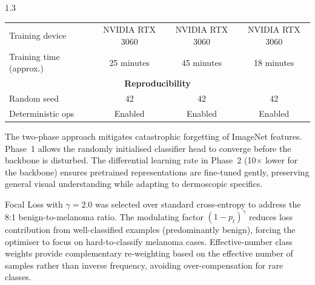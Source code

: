 \begin{spacing}{1.3}
\begin{table}[H]
\begin{tabular}{lccc}
Training device       & NVIDIA RTX 3060  & NVIDIA RTX 3060   & NVIDIA RTX 3060    \\
Training time (approx.) & 25 minutes     & 45 minutes        & 18 minutes         \\
\midrule
\multicolumn{4}{c}{\textbf{Reproducibility}} \\
\midrule
Random seed           & 42               & 42                & 42                 \\
Deterministic ops     & Enabled       & Enabled           & Enabled            \\
\bottomrule
\end{tabular}
\end{table}

The two-phase approach mitigates catastrophic forgetting of ImageNet features. Phase~1 allows the randomly initialised classifier head to converge before the backbone is disturbed. The differential learning rate in Phase~2 (10$\times$ lower for the backbone) ensures pretrained representations are fine-tuned gently, preserving general visual understanding while adapting to dermoscopic specifics.

Focal Loss with $\gamma = 2.0$ was selected over standard cross-entropy to address the 8:1 benign-to-melanoma ratio. The modulating factor \((1 - p_t)^\gamma\) reduces loss contribution from well-classified examples (predominantly benign), forcing the optimiser to focus on hard-to-classify melanoma cases. Effective-number class weights provide complementary re-weighting based on the effective number of samples rather than inverse frequency, avoiding over-compensation for rare classes.

\end{spacing}
